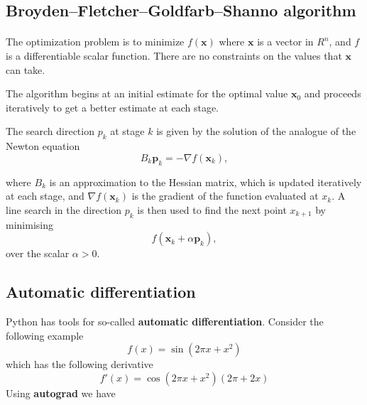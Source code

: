 \documentclass[%
oneside,                 %
final,                   %
10pt]{article}
\begin{document}
\subsection*{Broyden–Fletcher–Goldfarb–Shanno algorithm}

\paragraph{}
The optimization problem is to minimize $f(\mathbf {x} )$ where $\mathbf {x}$  is a vector in $R^{n}$, and $f$ is a differentiable scalar function. There are no constraints on the values that  $\mathbf {x}$  can take.

The algorithm begins at an initial estimate for the optimal value $\mathbf {x}_{0}$ and proceeds iteratively to get a better estimate at each stage.

The search direction $p_k$ at stage $k$ is given by the solution of the analogue of the Newton equation
\[
B_{k}\mathbf {p} _{k}=-\nabla f(\mathbf {x}_{k}),
\]

where $B_{k}$ is an approximation to the Hessian matrix, which is
updated iteratively at each stage, and $\nabla f(\mathbf {x} _{k})$
is the gradient of the function
evaluated at $x_k$. 
A line search in the direction $p_k$ is then used to
find the next point $x_{k+1}$ by minimising 
\[
f(\mathbf {x}_{k}+\alpha \mathbf {p}_{k}),
\]
over the scalar $\alpha > 0$.





\subsection*{Automatic differentiation}
Python has tools for so-called \textbf{automatic differentiation}.
Consider the following example
\[
f(x) = \sin\left(2\pi x + x^2\right)
\]
which has the following derivative
\[
f'(x) = \cos\left(2\pi x + x^2\right)\left(2\pi + 2x\right) 
\]
Using \textbf{autograd} we have
\end{document}
